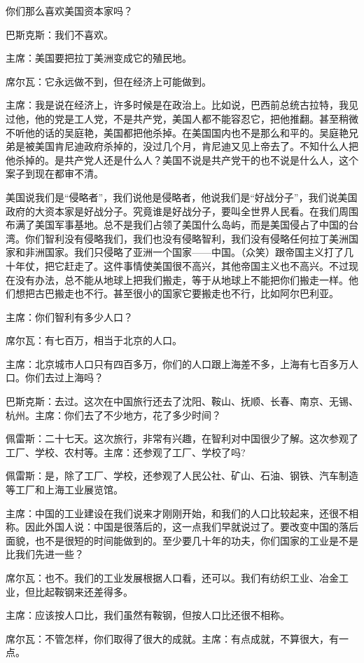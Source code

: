你们那么喜欢美国资本家吗？

巴斯克斯：我们不喜欢。

主席：美国要把拉丁美洲变成它的殖民地。

席尔瓦：它永远做不到，但在经济上可能做到。

主席：我是说在经济上，许多时候是在政治上。比如说，巴西前总统古拉特，我见过他，他的党是工人党，不是共产党，美国人都不能容忍它，把他推翻。甚至稍微不听他的话的吴庭艳，美国都把他杀掉。在美国国内也不是那么和平的。吴庭艳兄弟是被美国肯尼迪政府杀掉的，没过几个月，肯尼迪又见上帝去了。不知什么人把他杀掉的。是共产党人还是什么人？美国不说是共产党干的也不说是什么人，这个案子到现在都审不清。

美国说我们是“侵略者”，我们说他是侵略者，他说我们是“好战分子”，我们说美国政府的大资本家是好战分子。究竟谁是好战分子，要叫全世界人民看。在我们周围布满了美国军事基地。总不是我们占领了美国什么岛屿，而是美国侵占了中国的台湾。你们智利没有侵略我们，我们也没有侵略智利，我们没有侵略任何拉丁美洲国家和非洲国家。我们只侵略了亚洲一个国家——中国。（众笑）跟帝国主义打了几十年仗，把它赶走了。这件事情使美国很不高兴，其他帝国主义也不高兴。不过现在没有办法，总不能从地球上把我们搬走，等于从地球上不能把你们搬走一样。他们想把古巴搬走也不行。甚至很小的国家它要搬走也不行，比如阿尔巴利亚。

主席：你们智利有多少人口？

席尔瓦：有七百万，相当于北京的人口。

主席：北京城市人口只有四百多万，你们的人口跟上海差不多，上海有七百多万人口。你们去过上海吗？

巴斯克斯：去过。这次在中国旅行还去了沈阳、鞍山、抚顺、长春、南京、无锡、杭州。主席：你们去了不少地方，花了多少时间？

佩雷斯：二十七天。这次旅行，非常有兴趣，在智利对中国很少了解。这次参观了工厂、学校、农村等。主席：还参观了工厂、学校了吗?

佩雷斯：是，除了工厂、学校，还参观了人民公社、矿山、石油、钢铁、汽车制造等工厂和上海工业展览馆。

主席：中国的工业建设在我们说来才刚刚开始，和我们的人口比较起来，还很不相称。因此外国人说：中国是很落后的，这一点我们早就说过了。要改变中国的落后面貌，也不是很短的时间能做到的。至少要几十年的功夫，你们国家的工业是不是比我们先进一些？

席尔瓦：也不。我们的工业发展根据人口看，还可以。我们有纺织工业、冶金工业，但比起鞍钢来还差得多。

主席：应该按人口比，我们虽然有鞍钢，但按人口比还很不相称。

席尔瓦：不管怎样，你们取得了很大的成就。主席：有点成就，不算很大，有一点。

